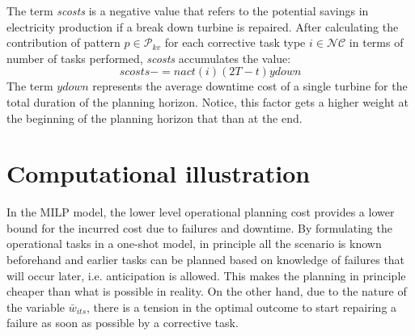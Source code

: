 The term \emph{scosts} is a negative value that refers to the potential savings in electricity production if a break down turbine is repaired. After calculating the contribution of pattern $p\in\mathcal{P}_{kv}$ for each  corrective task type $i\in \mathcal{NC}$ in terms of number of tasks performed, \emph{scosts} accumulates the value:
%
$$scosts-=nact(i)(2T-t)ydown$$
%
The term $ydown$ represents the average downtime cost of a single turbine for the total duration of the planning horizon. Notice, this factor gets a higher weight at the beginning of the planning horizon that than at the end.









		


\section{Computational illustration}
\label{sec:computationalstudy}

In the MILP model, the lower level operational planning cost provides a lower bound for the incurred cost due to failures and downtime. By formulating the operational tasks in a one-shot model, in principle all the scenario is known beforehand and earlier tasks can be planned based on knowledge of failures that will occur later, i.e. anticipation is allowed. This makes the planning in principle cheaper than what is possible in reality. On the other hand, due to the  nature of the variable $\bar{w}_{its}$, there is a tension in the optimal outcome to start repairing a failure as soon as possible by a corrective task. 

